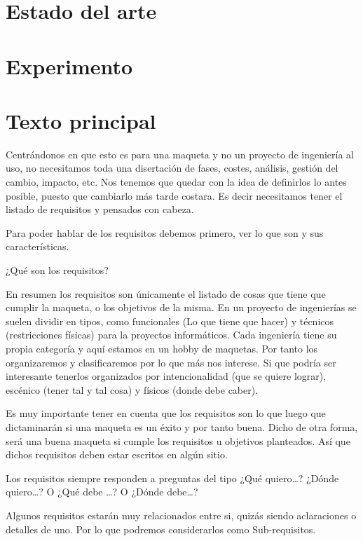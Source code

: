 \section{Estado del arte}

\section{Experimento}
\section{Texto principal}
Centrándonos en que esto es para una maqueta y no un proyecto de ingeniería al uso, no necesitamos toda una disertación de fases, costes, análisis, gestión del cambio, impacto, etc. Nos tenemos que quedar con la idea de definirlos lo antes posible, puesto que cambiarlo más tarde costara. Es decir necesitamos tener el listado de requisitos y pensados con cabeza. 

 

Para poder hablar de los requisitos debemos primero, ver lo que son y sus características. 

 

¿Qué son los requisitos? 

En resumen los requisitos son únicamente el listado de cosas que tiene que cumplir la maqueta, o los objetivos de la misma. En un proyecto de ingenierías se suelen dividir en tipos, como funcionales (Lo que tiene que hacer) y técnicos (restricciones físicas) para la proyectos informáticos. Cada ingeniería tiene su propia categoría y aquí estamos en un hobby de maquetas. Por tanto los organizaremos y clasificaremos por lo que más nos interese.  Si que podría ser interesante tenerlos organizados por intencionalidad (que se quiere lograr), escénico (tener tal y tal cosa) y físicos (donde debe caber). 

 

Es muy importante tener en cuenta que los requisitos son lo que luego que dictaminarán si una maqueta es un éxito y por tanto buena. Dicho de otra forma, será una buena maqueta si cumple los requisitos u objetivos planteados. Así que dichos requisitos deben estar escritos en algún sitio. 

 

Los requisitos siempre responden a preguntas del tipo ¿Qué quiero…? ¿Dónde quiero…? O ¿Qué debe …? O ¿Dónde debe…? 

 

Algunos requisitos estarán muy relacionados entre si, quizás siendo aclaraciones o detalles de uno. Por lo que podremos considerarlos como Sub-requisitos.  


